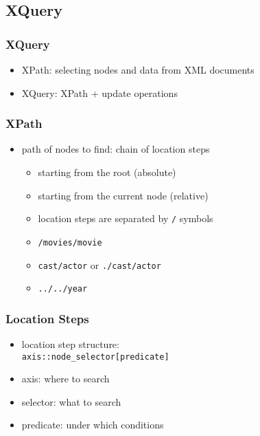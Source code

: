 \documentclass[dvipsnames]{beamer}
\theoremstyle{plain}
\begin{document}
\subsection{XQuery}

\begin{frame}
  \frametitle{XQuery}

  \begin{itemize}
    \item XPath: selecting nodes and data from XML documents
    \item XQuery: XPath + update operations
  \end{itemize}
\end{frame}

\begin{frame}
  \frametitle{XPath}

  \begin{itemize}
    \item path of nodes to find: chain of location steps
    \begin{itemize}
      \item starting from the root (absolute)
      \item starting from the current node (relative)

      \medskip
      \item location steps are separated by \lstinline!/! symbols
    \end{itemize}

    \pause
    \begin{example}
      \begin{itemize}
       \item \lstinline!/movies/movie!
       \item \lstinline!cast/actor! or \lstinline!./cast/actor!
       \item \lstinline!../../year!
      \end{itemize}
    \end{example}
  \end{itemize}
\end{frame}

\begin{frame}
  \frametitle{Location Steps}

  \begin{itemize}
    \item location step structure:\\
      \lstinline!axis::node_selector[predicate]!

    \pause
    \medskip
    \item axis: where to search
    \item selector: what to search
    \item predicate: under which conditions
  \end{itemize}
\end{frame}
\end{document}
